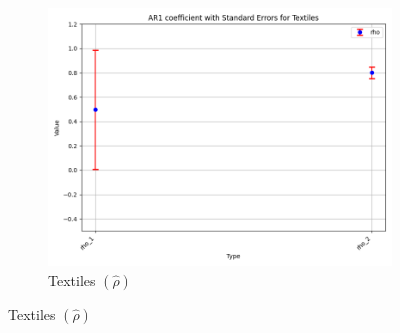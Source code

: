 \documentclass{article}
\begin{document}
\begin{figure}[ht!]
\begin{subfigure}[t]{0.32\textwidth}
        \centering
        \includegraphics[width=\textwidth]{figure/empirical_ar1_mixture_rho_with_error_bars_Textiles.png}
        \caption{Textiles  $(\hat\rho)$}
    \end{subfigure}

\end{figure}
\end{document}

